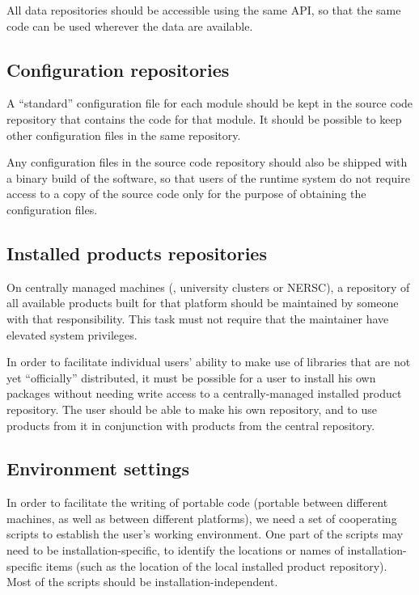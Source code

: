 \documentclass[draftmode,draftwater]{memarticle}
\begin{document}
All data repositories should be accessible using the same API, so that
the same code can be used wherever the data are available.

\subsection{Configuration repositories}

A ``standard'' configuration file for each module should be kept in the
source code repository that contains the code for that module. It should
be possible to keep other configuration files in the same repository.

Any configuration files in the source code repository should also be
shipped with a binary build of the software, so that users of the
runtime system do not require access to a copy of the source code only
for the purpose of obtaining the configuration files.

\subsection{Installed products repositories}

On centrally managed machines (\eg, university clusters or NERSC), a
repository of all available products built for that platform should be
maintained by someone with that responsibility. This task must not
require that the maintainer have elevated system privileges.

In order to facilitate individual users' ability to make use of
libraries that are not yet ``officially'' distributed, it must be
possible for a user to install his own packages without needing write
access to a centrally-managed installed product repository. The user
should be able to make his own repository, and to use products from it
in conjunction with products from the central repository.

\subsection{Environment settings}

In order to facilitate the writing of portable code (portable between
different machines, as well as between different platforms), we need a
set of cooperating scripts to establish the user's working environment.
One part of the scripts may need to be installation-specific, to
identify the locations or names of installation-specific items (such as
the location of the local installed product repository). Most of the
scripts should be installation-independent.
\end{document}
